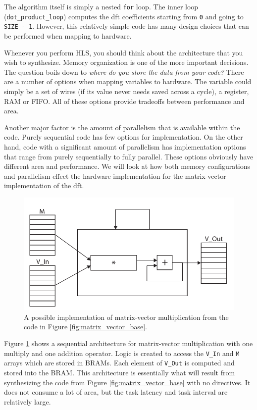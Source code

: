 The algorithm itself is simply a nested \lstinline|for| loop. The inner loop (\lstinline|dot_product_loop|) computes the \gls{dft} coefficients starting from \lstinline|0| and going to \lstinline|SIZE - 1|. However, this relatively simple code has many design choices that can be performed when mapping to hardware. 

Whenever you perform HLS, you should think about the architecture that you wish to synthesize. Memory organization is one of the more important decisions. The question boils down to \emph{where do you store the data from your code?} There are a number of options when mapping variables to hardware. The variable could simply be a set of wires (if its value never needs saved across a cycle), a register, RAM or FIFO. All of these options provide tradeoffs between performance and area. 

Another major factor is the amount of parallelism that is available within the code. Purely sequential code has few options for implementation. On the other hand, code with a significant amount of parallelism has implementation options that range from purely sequentially to fully parallel. These options obviously have different area and performance. We will look at how both memory configurations and parallelism effect the hardware implementation for the matrix-vector implementation of the \gls{dft}.

\begin{figure}
\centering
%
\includegraphics[width= 0.4 \textwidth]{images/matrix_vector_sequential}

\caption{A possible implementation of matrix-vector multiplication from the code in Figure \ref{fig:matrix_vector_base}.}
\label{fig:matrix_vector_sequential}
\end{figure}

Figure \ref{fig:matrix_vector_sequential} shows a sequential architecture for matrix-vector multiplication with one multiply and one addition operator.  Logic is created to access the \lstinline|V_In| and \lstinline|M| arrays which are stored in BRAMs. Each element of \lstinline|V_Out| is computed and stored into the BRAM. This architecture is essentially what will result from synthesizing the code from Figure \ref{fig:matrix_vector_base} with no directives. It does not consume a lot of area, but the task latency and task interval are relatively large.

